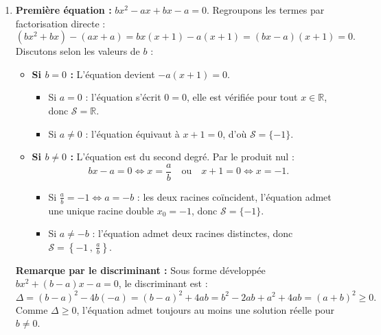 \documentclass[11pt,a4paper]{article}
\newcommand{\R}{\mathbb{R}}
\begin{document}
\begin{correctionbox}
\begin{enumerate}
    \item \textbf{Première équation :} $bx^2 - ax + bx - a = 0$.
    Regroupons les termes par factorisation directe :
    \[
    (bx^2 + bx) - (ax + a) = bx(x + 1) - a(x + 1) = (bx - a)(x + 1) = 0.
    \]
    Discutons selon les valeurs de $b$ :
    \begin{itemize}
        \item \textbf{Si $b = 0$ :} L'équation devient $-a(x+1) = 0$.
        \begin{itemize}
            \item Si $a = 0$ : l'équation s'écrit $0 = 0$, elle est vérifiée pour tout $x \in \R$, donc $\mathcal{S} = \R$.
            \item Si $a \neq 0$ : l'équation équivaut à $x + 1 = 0$, d'où $\mathcal{S} = \{-1\}$.
        \end{itemize}
        \item \textbf{Si $b \neq 0$ :} L'équation est du second degré. Par le produit nul :
        \[
        bx - a = 0 \iff x = \frac{a}{b} \quad \text{ou} \quad x + 1 = 0 \iff x = -1.
        \]
        \begin{itemize}
            \item Si $\frac{a}{b} = -1 \iff a = -b$ : les deux racines coïncident, l'équation admet une unique racine double $x_0 = -1$, donc $\mathcal{S} = \{-1\}$.
            \item Si $a \neq -b$ : l'équation admet deux racines distinctes, donc $\mathcal{S} = \left\{-1\,,\, \frac{a}{b}\right\}$.
        \end{itemize}
    \end{itemize}
    \textbf{Remarque par le discriminant :} Sous forme développée $bx^2 + (b-a)x - a = 0$, le discriminant est :
    \[
    \Delta = (b-a)^2 - 4b(-a) = (b-a)^2 + 4ab = b^2 - 2ab + a^2 + 4ab = (a+b)^2 \ge 0.
    \]
    Comme $\Delta \ge 0$, l'équation admet toujours au moins une solution réelle pour $b \neq 0$.


\end{enumerate}
\end{correctionbox}
\end{document}
